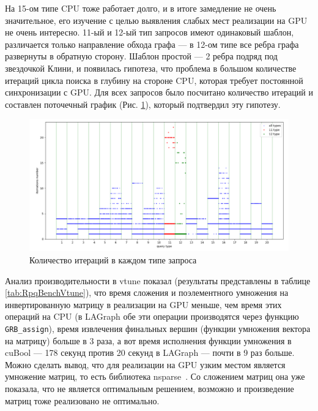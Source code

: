 На 15-ом типе CPU тоже работает долго, и в итоге замедление не очень значительное, его изучение с целью выявления слабых мест реализации на GPU не очень интересно. 11-ый и 12-ый тип запросов имеют одинаковый шаблон, различается только направление обхода графа --- в 12-ом типе все ребра графа развернуты в обратную сторону. Шаблон простой --- 2 ребра подряд под звездочкой Клини, и появилась гипотеза, что проблема в большом количестве итераций цикла поиска в глубину на стороне CPU, которая требует постоянной синхронизации с GPU. Для всех запросов было посчитано количество итераций и составлен поточечный график (Рис. \ref{fig:IterDep}), который подтвердил эту гипотезу.  

\begin{figure}[H]
    \centering
    \includegraphics[scale = 0.4]{figures/iter_dep.png}
    \caption{Количество итераций в каждом типе запроса}
    \label{fig:IterDep}
\end{figure}



Анализ производительности в vtune показал (результаты представлены в таблице \ref{tab:RpqBenchVtune}), что время сложения и поэлементного умножения на инвертированную матрицу в реализации на GPU меньше, чем время этих операций на CPU (в LAGraph обе эти операции производятся через функцию \verb|GRB_assign|), время извлечения финальных вершин (функции умножения вектора на матрицу) больше в 3 раза, а вот время исполнения функции умножения в cuBool --- 178 секунд против 20 секунд в LAGraph --- почти в 9 раз больше. Можно сделать вывод, что для реализации на GPU узким местом является умножение матриц, то есть библиотека nsparse~\cite{Nsparse}. Со сложением матриц она уже показала, что не является оптимальным решением, возможно и произведение матриц тоже реализовано не оптимально.

